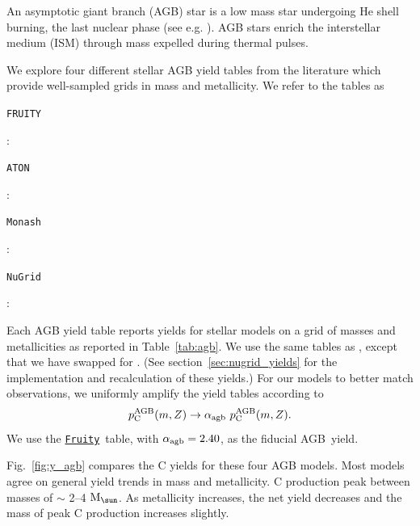 \documentclass[fleqn,
usenatbib]{mnras}
\newcommand{\fruity}{\texttt{\hyperlink{fruity}{Fruity}}}
\newcommand{\cfactor}{2.40}
\newcommand{\agb}{AGB}
\newcommand{\ycagb}{\y_{\rm C}^{\rm AGB}}
\newcommand{\y}{p}
\newcommand{\Mo}{ {\rm M}_{\sun}}
\begin{document}
An asymptotic giant branch (AGB) star is a low mass star undergoing He shell burning, the last nuclear phase (see e.g. \citealt{PR2023}). AGB stars enrich the interstellar medium (ISM) through mass expelled during thermal pulses. 


We explore four different stellar AGB yield tables from the literature which provide well-sampled grids in mass and metallicity. We refer to the tables as 
\begin{description}
    \item \hypertarget{fruity}{\texttt{FRUITY}}: \citet{cristallo+11, cristallo+15}
    \item \hypertarget{aton}{\texttt{ATON}}: \citet{ventura+13,ventura+14,ventura+18, ventura+20}
    \item \hypertarget{monash}{\texttt{Monash}}: \citet{KL16, karakas+18}
    \item \hypertarget{nugrid}{\texttt{NuGrid}}: \citet{pignatari+16, ritter+18, battino+19, battino+21}
\end{description}
Each AGB yield table reports yields for stellar models on a grid of masses and metallicities as reported in Table~\ref{tab:agb}.
We use the same tables as \citet{james+23}, except that we have swapped \citet{karakas10} for \citet{pignatari+16}. (See section~\ref{sec:nugrid_yields} for the implementation and recalculation of these yields.)
For our models to better match observations, we uniformly amplify the yield tables according to
\begin{equation} \label{eq:alpha}
        \ycagb(m, Z) \rightarrow \alpha_{\rm agb}\ \ycagb(m, Z).
\end{equation}
We use the \fruity\ table, with $\alpha_{\rm agb}=\cfactor$, as the fiducial \agb\ yield.

Fig.~\ref{fig:y_agb} compares the C yields for these four AGB models.
Most models agree on general yield trends in mass and metallicity.
C production peak between masses of $\sim$ 2--4 $\Mo$. As metallicity increases, the net yield decreases and the mass of peak C production increases slightly.
\end{document}
